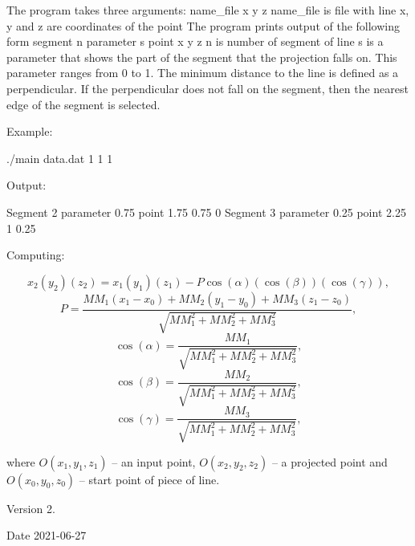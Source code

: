 The program takes three arguments\+: name\+\_\+file x y z name\+\_\+file is file with line x, y and z are coordinates of the point The program prints output of the following form segment n parameter s point x y z n is number of segment of line s is a parameter that shows the part of the segment that the projection falls on. This parameter ranges from 0 to 1. The minimum distance to the line is defined as a perpendicular. If the perpendicular does not fall on the segment, then the nearest edge of the segment is selected.

Example\+: \begin{DoxyVerb}./main data.dat 1 1 1 
\end{DoxyVerb}
 Output\+: \begin{DoxyVerb}Segment 2 parameter 0.75 point 1.75 0.75 0
Segment 3 parameter 0.25 point 2.25 1 0.25
\end{DoxyVerb}
 Computing\+:

\[ x_2 (y_2) (z_2) = x_1 (y_1) (z_1) - P \cos(\alpha) (\cos(\beta)) (\cos(\gamma)), \] \[ P = \frac{MM_1(x_1 - x_0) + MM_2(y_1 - y_0) + MM_3(z_1 - z_0)}{\sqrt{MM_1^2 + MM_2^2 + MM_3^2}}, \] \[ \cos(\alpha) = \frac{MM_1}{\sqrt{MM_1^2 + MM_2^2 + MM_3^2}}, \] \[ \cos(\beta) = \frac{MM_2}{\sqrt{MM_1^2 + MM_2^2 + MM_3^2}}, \] \[ \cos(\gamma) = \frac{MM_3}{\sqrt{MM_1^2 + MM_2^2 + MM_3^2}}, \]

where $O(x_1, y_1, z_1)$ -- an input point, $O(x_2, y_2, z_2)$ -- a projected point and $ O(x_0, y_0, z_0)$ -- start point of piece of line.

\begin{DoxyVersion}{Version}
2. 
\end{DoxyVersion}
\begin{DoxyDate}{Date}
2021-\/06-\/27 
\end{DoxyDate}

